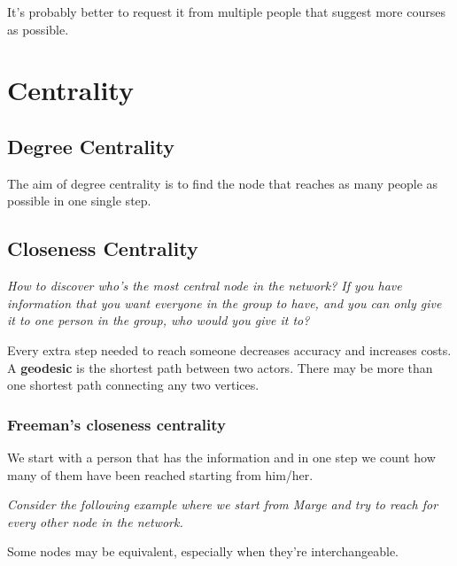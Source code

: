 \documentclass[
  notitlepage,
  onecolumn,
  openany]{book}
\begin{document}
It's probably better to request it from multiple people that suggest more courses as possible.

\hypertarget{centrality}{%
\chapter{Centrality}\label{centrality}}

\hypertarget{degree-centrality-1}{%
\section{Degree Centrality}\label{degree-centrality-1}}

The aim of degree centrality is to find the node that reaches as many people as possible in one single step.

\hypertarget{closeness-centrality}{%
\section{Closeness Centrality}\label{closeness-centrality}}

\emph{How to discover who's the most central node in the network? If you have information that you want everyone in the group to have, and you can only give it to one person in the group, who would you give it to?}

Every extra step needed to reach someone decreases accuracy and increases costs. A \textbf{geodesic} is the shortest path between two actors. There may be more than one shortest path connecting any two vertices.

\hypertarget{freemans-closeness-centrality}{%
\subsection{Freeman's closeness centrality}\label{freemans-closeness-centrality}}

We start with a person that has the information and in one step we count how many of them have been reached starting from him/her.

\emph{Consider the following example where we start from Marge and try to reach for every other node in the network.}

Some nodes may be equivalent, especially when they're interchangeable.
\end{document}
